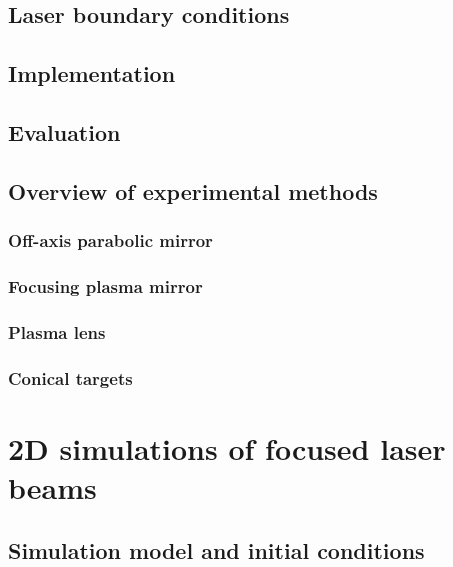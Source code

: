 \documentclass[12pt, twoside, a4paper, openright]{report}
\begin{document}
\section{Laser boundary conditions}


\section{Implementation}


\section{Evaluation}


\section{Overview of experimental methods}


\subsection{Off-axis parabolic mirror}


\subsection{Focusing plasma mirror}


\subsection{Plasma lens}


\subsection{Conical targets}



\chapter{2D simulations of focused laser beams}


\section{Simulation model and initial conditions}

\end{document}
